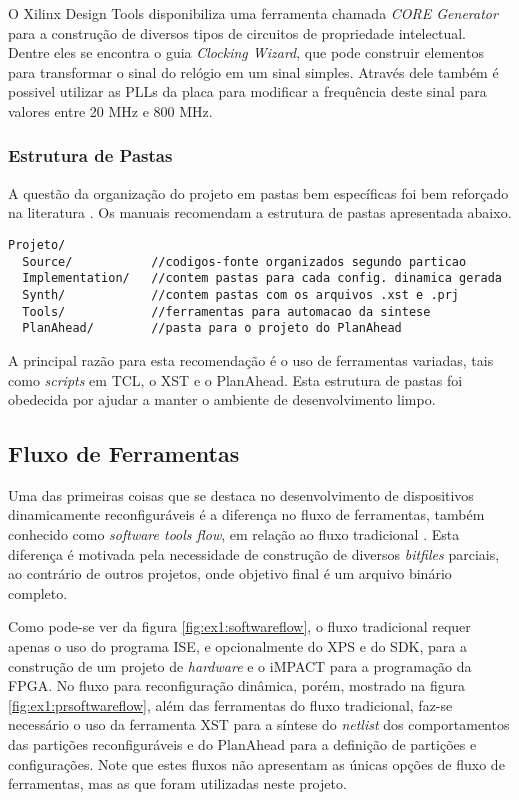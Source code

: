 \documentclass[11pt,a4paper,oneside]{book}
\begin{document}
O Xilinx Design Tools disponibiliza uma ferramenta chamada \textit{CORE Generator} para a construção de diversos tipos de circuitos de propriedade intelectual.
Dentre eles se encontra o guia \textit{Clocking Wizard}, que pode construir elementos para transformar o sinal do relógio em um sinal simples.
Através dele também é possivel utilizar as PLLs da placa para modificar a frequência deste sinal para valores entre 20 MHz e 800 MHz.

\subsubsection{Estrutura de Pastas}
A questão da organização do projeto em pastas bem específicas foi bem reforçado na literatura \cite{ug702, ug743, ug744}.
Os manuais recomendam a estrutura de pastas apresentada abaixo.
\begin{lstlisting}
Projeto/
  Source/           //codigos-fonte organizados segundo particao
  Implementation/   //contem pastas para cada config. dinamica gerada
  Synth/            //contem pastas com os arquivos .xst e .prj
  Tools/            //ferramentas para automacao da sintese
  PlanAhead/        //pasta para o projeto do PlanAhead
\end{lstlisting}
A principal razão para esta recomendação é o uso de ferramentas variadas, tais como \textit{scripts} em TCL, o XST e o PlanAhead.
Esta estrutura de pastas foi obedecida por ajudar a manter o ambiente de desenvolvimento limpo.

\subsection{Fluxo de Ferramentas}
Uma das primeiras coisas que se destaca no desenvolvimento de dispositivos dinamicamente reconfiguráveis é a diferença no fluxo de ferramentas, também conhecido como \textit{software tools flow}, em relação ao fluxo tradicional \cite{ug743}.
Esta diferença é motivada pela necessidade de construção de diversos \textit{bitfiles} parciais, ao contrário de outros projetos, onde objetivo final é um arquivo binário completo.

Como pode-se ver da figura \ref{fig:ex1:softwareflow}, o fluxo tradicional requer apenas o uso do programa ISE, e opcionalmente do XPS e do SDK, para a construção de um projeto de \textit{hardware} e o iMPACT para a programação da FPGA.
No fluxo para reconfiguração dinâmica, porém, mostrado na figura \ref{fig:ex1:prsoftwareflow}, além das ferramentas do fluxo tradicional, faz-se necessário o uso da ferramenta XST para a síntese do \textit{netlist} dos comportamentos das partições reconfiguráveis e do PlanAhead para a definição de partições e configurações.
Note que estes fluxos não apresentam as únicas opções de fluxo de ferramentas, mas as que foram utilizadas neste projeto.
\end{document}

